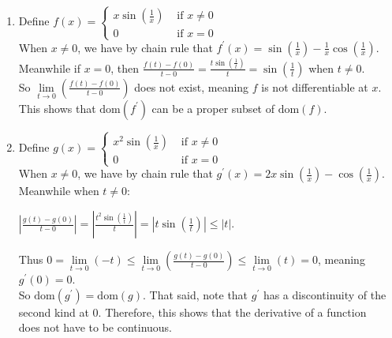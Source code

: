 \documentclass{book}
\newcommand{\exTwo}{%
   \color{RedViolet}%
   \fontsize{13}{15}\selectfont%
}
\newenvironment{myIndent}{%
   \begin{adjustwidth}{2.5em}{0em}%
}{%
   \end{adjustwidth}%
}
\newcommand{\domain}[1]{\mathrm{dom}(#1)}
\newcommand{\retTwo}{\hfill\bigbreak}
\begin{document}
{\begin{myIndent}\exTwo
   \begin{enumerate}
      \item Define $f(x) = \left\{
      \begin{matrix}
         x\sin(\frac{1}{x}) & \text{ if } x \neq 0 \\
         0 & \text{ if } x = 0
      \end{matrix}\right.$\\

      When $x \neq 0$, we have by chain rule that $f^\prime(x) = \sin(\frac{1}{x}) - \frac{1}{x}\cos(\frac{1}{x})$.\\ Meanwhile if $x = 0$, then $\frac{f(t) - f(0)}{t - 0} = \frac{t\sin(\frac{1}{t})}{t} = \sin(\frac{1}{t})$ when $t \neq 0$.\\ So $\lim\limits_{t\rightarrow 0}\left(\frac{f(t) - f(0)}{t - 0}\right)$ does not exist, meaning $f$ is not differentiable at $x$.\\

      This shows that $\domain{f^\prime}$ can be a proper subset of $\domain{f}$.\\

      \item Define $g(x) = \left\{
      \begin{matrix}
         x^2\sin(\frac{1}{x}) & \text{ if } x \neq 0 \\
         0 & \text{ if } x = 0
      \end{matrix}\right.$\\
      
      When $x \neq 0$, we have by chain rule that $g^\prime(x) = 2x\sin(\frac{1}{x}) - \cos(\frac{1}{x})$.\\ Meanwhile when $t \neq 0$:

      {\center $\left|\frac{g(t) - g(0)}{t - 0}\right| = \left|\frac{t^2\sin(\frac{1}{t})}{t}\right| = \left|t\sin(\frac{1}{t})\right| \leq |t|$. \retTwo\par}

      Thus $0 = \lim\limits_{t\rightarrow 0}(-t) \leq \lim\limits_{t\rightarrow 0}\left(\frac{g(t) - g(0)}{t - 0}\right) \leq \lim\limits_{t\rightarrow 0}(t) = 0$, meaning $g^\prime(0) = 0$.\\ [2pt] So $\domain{g^\prime} = \domain{g}$. That said, note that $g^\prime$ has a discontinuity of the\\ [2pt] second kind at $0$. Therefore, this shows that the derivative of a function\\ [2pt] does not have to be continuous.
   \end{enumerate}
\end{myIndent}}
\end{document}

